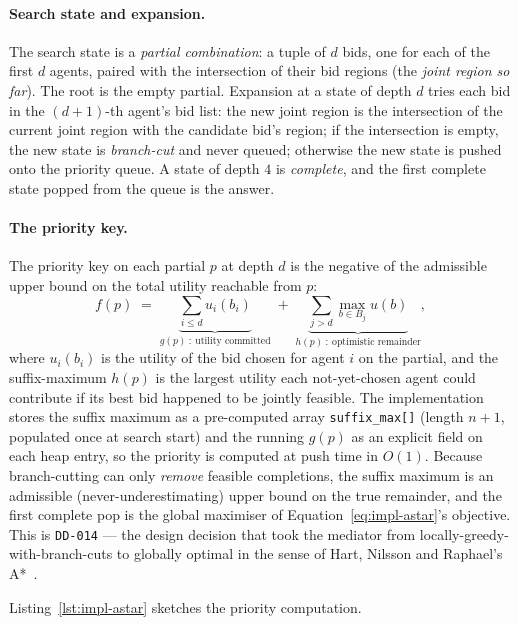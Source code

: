 \paragraph{Search state and expansion.}
The search state is a \emph{partial combination}: a tuple of $d$ bids,
one for each of the first $d$ agents, paired with the intersection of
their bid regions (the \emph{joint region so far}). The root is the
empty partial. Expansion at a state of depth $d$ tries each bid in the
$(d{+}1)$-th agent's bid list: the new joint region is the intersection
of the current joint region with the candidate bid's region; if the
intersection is empty, the new state is \emph{branch-cut} and never
queued; otherwise the new state is pushed onto the priority queue.
A state of depth $4$ is \emph{complete}, and the first complete state
popped from the queue is the answer.

\paragraph{The priority key.}
The priority key on each partial $p$ at depth $d$ is the negative of
the admissible upper bound on the total utility reachable from $p$:
%
\begin{equation}
  \label{eq:impl-astar}
  f(p) \;=\; \underbrace{\sum_{i \le d} u_i(b_i)}_{g(p)\ :\ \text{utility committed}}
           \;+\; \underbrace{\sum_{j > d} \max_{b \in B_j} u(b)}_{h(p)\ :\ \text{optimistic remainder}} ,
\end{equation}
%
where $u_i(b_i)$ is the utility of the bid chosen for agent $i$ on the
partial, and the suffix-maximum $h(p)$ is the largest utility each
not-yet-chosen agent could contribute if its best bid happened to be
jointly feasible. The implementation stores the suffix maximum as a
pre-computed array \texttt{suffix\_max[]} (length $n{+}1$, populated
once at search start) and the running $g(p)$ as an explicit field on
each heap entry, so the priority is computed at push time in $O(1)$.
Because branch-cutting can only \emph{remove} feasible completions, the
suffix maximum is an admissible (never-underestimating) upper bound on
the true remainder, and the first complete pop is the global maximiser
of Equation~\eqref{eq:impl-astar}'s objective. This is
\texttt{DD-014} --- the design decision that took the mediator from
locally-greedy-with-branch-cuts to globally optimal in the sense of
Hart, Nilsson and Raphael's A*~\cite{hart1968astar}.

Listing~\ref{lst:impl-astar} sketches the priority computation.

